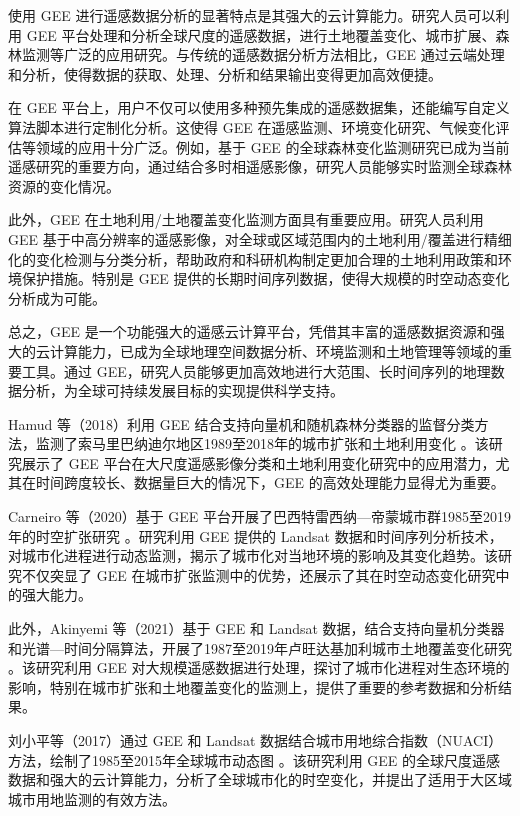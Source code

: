 \documentclass[AutoFakeBold]{LZUThesis-PgD&PhD}
\begin{document}
使用 GEE 进行遥感数据分析的显著特点是其强大的云计算能力。研究人员可以利用 GEE 平台处理和分析全球尺度的遥感数据，进行土地覆盖变化、城市扩展、森林监测等广泛的应用研究。与传统的遥感数据分析方法相比，GEE 通过云端处理和分析，使得数据的获取、处理、分析和结果输出变得更加高效便捷。

在 GEE 平台上，用户不仅可以使用多种预先集成的遥感数据集，还能编写自定义算法脚本进行定制化分析。这使得 GEE 在遥感监测、环境变化研究、气候变化评估等领域的应用十分广泛。例如，基于 GEE 的全球森林变化监测研究已成为当前遥感研究的重要方向，通过结合多时相遥感影像，研究人员能够实时监测全球森林资源的变化情况。

此外，GEE 在土地利用/土地覆盖变化监测方面具有重要应用。研究人员利用 GEE 基于中高分辨率的遥感影像，对全球或区域范围内的土地利用/覆盖进行精细化的变化检测与分类分析，帮助政府和科研机构制定更加合理的土地利用政策和环境保护措施。特别是 GEE 提供的长期时间序列数据，使得大规模的时空动态变化分析成为可能。

总之，GEE 是一个功能强大的遥感云计算平台，凭借其丰富的遥感数据资源和强大的云计算能力，已成为全球地理空间数据分析、环境监测和土地管理等领域的重要工具。通过 GEE，研究人员能够更加高效地进行大范围、长时间序列的地理数据分析，为全球可持续发展目标的实现提供科学支持。

Hamud 等（2018）利用 GEE 结合支持向量机和随机森林分类器的监督分类方法，监测了索马里巴纳迪尔地区1989至2018年的城市扩张和土地利用变化 \cite{Hamud2018}。该研究展示了 GEE 平台在大尺度遥感影像分类和土地利用变化研究中的应用潜力，尤其在时间跨度较长、数据量巨大的情况下，GEE 的高效处理能力显得尤为重要。

Carneiro 等（2020）基于 GEE 平台开展了巴西特雷西纳—帝蒙城市群1985至2019年的时空扩张研究 \cite{Carneiro2020}。研究利用 GEE 提供的 Landsat 数据和时间序列分析技术，对城市化进程进行动态监测，揭示了城市化对当地环境的影响及其变化趋势。该研究不仅突显了 GEE 在城市扩张监测中的优势，还展示了其在时空动态变化研究中的强大能力。

此外，Akinyemi 等（2021）基于 GEE 和 Landsat 数据，结合支持向量机分类器和光谱—时间分隔算法，开展了1987至2019年卢旺达基加利城市土地覆盖变化研究 \cite{Akinyemi2021}。该研究利用 GEE 对大规模遥感数据进行处理，探讨了城市化进程对生态环境的影响，特别在城市扩张和土地覆盖变化的监测上，提供了重要的参考数据和分析结果。

刘小平等（2017）通过 GEE 和 Landsat 数据结合城市用地综合指数（NUACI）方法，绘制了1985至2015年全球城市动态图 \cite{Liu2017}。该研究利用 GEE 的全球尺度遥感数据和强大的云计算能力，分析了全球城市化的时空变化，并提出了适用于大区域城市用地监测的有效方法。
\end{document}
